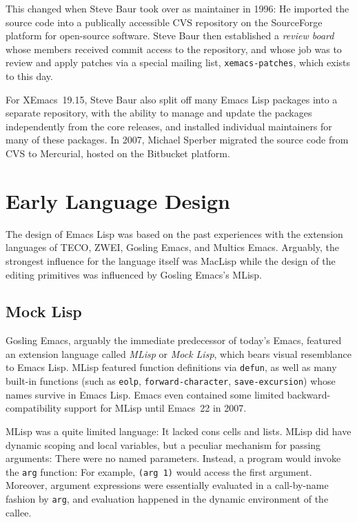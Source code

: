 \documentclass[format=acmsmall,screen]{acmart}
\newcommand \Elisp {Emacs Lisp}
\begin{document}
This changed when Steve Baur took over as maintainer in 1996: He
imported the source code into a publically accessible CVS repository on
the SourceForge platform for open-source software.  Steve Baur then
established a \textit{review board} whose members received commit
access to the repository, and whose job was to review and apply
patches via a special mailing list, \texttt{xemacs-patches}, which
exists to this day.

For XEmacs~19.15, Steve Baur also split off many \Elisp{} packages
into a separate repository, with the ability to manage and update the
packages independently from the core releases, and installed
individual maintainers for many of these packages.
In 2007, Michael Sperber migrated the source code from CVS to
Mercurial, hosted on the Bitbucket platform.

\section{Early Language Design}         %
\label{sec:early-history}

The design of \Elisp{} was based on the past experiences with the extension
languages of TECO, ZWEI, Gosling Emacs, and Multics Emacs.
Arguably, the strongest influence for the language itself was MacLisp while
the design of the editing primitives was influenced by Gosling Emacs's
MLisp.

\subsection{Mock Lisp}
\label{sec:mock-lisp}

Gosling Emacs, arguably the immediate predecessor of today's Emacs,
featured an extension language called \emph{MLisp} or \emph{Mock Lisp},
which bears visual resemblance to \Elisp{}.  MLisp featured function
definitions via \texttt{defun}, as well as many built-in functions (such as
\texttt{eolp}, \texttt{forward-character}, \texttt{save-excursion}) whose
names survive in \Elisp{}.  Emacs even contained some limited
back\-ward-compatibility support for MLisp until Emacs~22 in 2007.

MLisp was a quite limited language: It lacked cons cells and lists.
MLisp did have dynamic scoping and local variables, but a peculiar
mechanism for passing arguments:  There were no named
parameters.  Instead, a program would invoke the \texttt{arg}
function: For example, \texttt{(arg 1)} would access the first
argument.  Moreover, argument expressions were essentially evaluated
in a call-by-name fashion by \texttt{arg}, and evaluation happened in
the dynamic environment of the callee.
\end{document}
